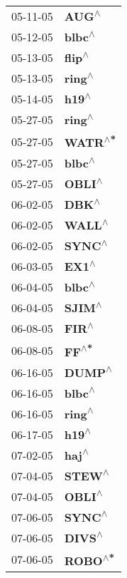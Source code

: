 \begin{supertabular}{p{0.08\textwidth}p{0.2\textwidth}}
 05-11-05 &     \textbf{AUG\textsuperscript{$\wedge$}} \\
 05-12-05 &    \textbf{blbc\textsuperscript{$\wedge$}} \\
 05-13-05 &    \textbf{flip\textsuperscript{$\wedge$}} \\
 05-13-05 &    \textbf{ring\textsuperscript{$\wedge$}} \\
 05-14-05 &     \textbf{h19\textsuperscript{$\wedge$}} \\
 05-27-05 &    \textbf{ring\textsuperscript{$\wedge$}} \\
 05-27-05 &   \textbf{WATR\textsuperscript{$\wedge$*}} \\
 05-27-05 &    \textbf{blbc\textsuperscript{$\wedge$}} \\
 05-27-05 &    \textbf{OBLI\textsuperscript{$\wedge$}} \\
 06-02-05 &     \textbf{DBK\textsuperscript{$\wedge$}} \\
 06-02-05 &    \textbf{WALL\textsuperscript{$\wedge$}} \\
 06-02-05 &    \textbf{SYNC\textsuperscript{$\wedge$}} \\
 06-03-05 &     \textbf{EX1\textsuperscript{$\wedge$}} \\
 06-04-05 &    \textbf{blbc\textsuperscript{$\wedge$}} \\
 06-04-05 &    \textbf{SJIM\textsuperscript{$\wedge$}} \\
 06-08-05 &     \textbf{FIR\textsuperscript{$\wedge$}} \\
 06-08-05 &     \textbf{FF\textsuperscript{$\wedge$*}} \\
 06-16-05 &    \textbf{DUMP\textsuperscript{$\wedge$}} \\
 06-16-05 &    \textbf{blbc\textsuperscript{$\wedge$}} \\
 06-16-05 &    \textbf{ring\textsuperscript{$\wedge$}} \\
 06-17-05 &     \textbf{h19\textsuperscript{$\wedge$}} \\
 07-02-05 &     \textbf{haj\textsuperscript{$\wedge$}} \\
 07-04-05 &    \textbf{STEW\textsuperscript{$\wedge$}} \\
 07-04-05 &    \textbf{OBLI\textsuperscript{$\wedge$}} \\
 07-06-05 &    \textbf{SYNC\textsuperscript{$\wedge$}} \\
 07-06-05 &    \textbf{DIVS\textsuperscript{$\wedge$}} \\
 07-06-05 &   \textbf{ROBO\textsuperscript{$\wedge$*}} \\

\end{supertabular}
